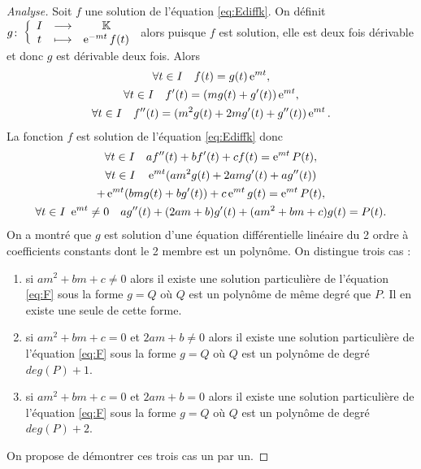 \begin{proof}[Analyse]
Soit  \(f\) une solution de l'équation \eqref{eq:Ediffk}. On définit \(g\colon \left\{\begin{array}{ccc} I & \longrightarrow &\mathbb{K}\\ t & \longmapsto & \operatorname{e}^{-mt}f(t) \end{array} \right.\) alors puisque \(f\) est solution, elle est deux fois dérivable et donc \(g\) est dérivable deux fois. Alors 
\begin{gather}
  \forall t \in I \quad f(t)=g(t)\operatorname{e}^{mt}, \\ 
  \forall t \in I \quad f'(t)= (mg(t)+g'(t))\operatorname{e}^{mt}, \\
  \forall t \in I \quad f''(t)=(m^2g(t)+2mg'(t)+g''(t))\operatorname{e}^{mt}.
\end{gather}
La fonction \(f\) est solution de l'équation \eqref{eq:Ediffk} donc 
\begin{gather}
  \forall t \in I \quad af''(t)+bf'(t)+cf(t)=\operatorname{e}^{mt} P(t), \\
  \forall t \in I \quad  \operatorname{e}^{mt}(am^2g(t)+2amg'(t)+ag''(t))  \notag \\ +\operatorname{e}^{mt}(bmg(t)+bg'(t))+c\operatorname{e}^{mt}g(t)=\operatorname{e}^{mt}P(t), \\
  \forall t \in I \ \operatorname{e}^{mt} \neq 0  \quad  ag''(t)+(2am+b)g'(t) +(am^2+bm+c)g(t)=P(t). \label{eq:F}
\end{gather}
On a montré que \(g\) est solution d'une équation différentielle linéaire du 2 ordre à coefficients constants dont le 2 membre est un polynôme. On distingue trois cas :
\begin{enumerate}
\item si \(am^2+bm+c \neq 0\) alors il existe une solution particulière de l'équation \eqref{eq:F} sous la forme \(g=Q\) où \(Q\) est un polynôme de même degré que \(P\). Il en existe une seule de cette forme.
\item si \(am^2+bm+c=0\) et \(2am+b \neq 0\) alors il existe une solution particulière de l'équation \eqref{eq:F} sous la forme \(g=Q\) où \(Q\) est un polynôme de degré \(deg(P)+1\).
\item si  \(am^2+bm+c=0\) et \(2am+b = 0\) alors il existe une solution particulière de l'équation \eqref{eq:F} sous la forme \(g=Q\) où \(Q\) est un polynôme de degré \(deg(P)+2\).
\end{enumerate}
On propose de démontrer ces trois cas un par un.


\end{proof}
